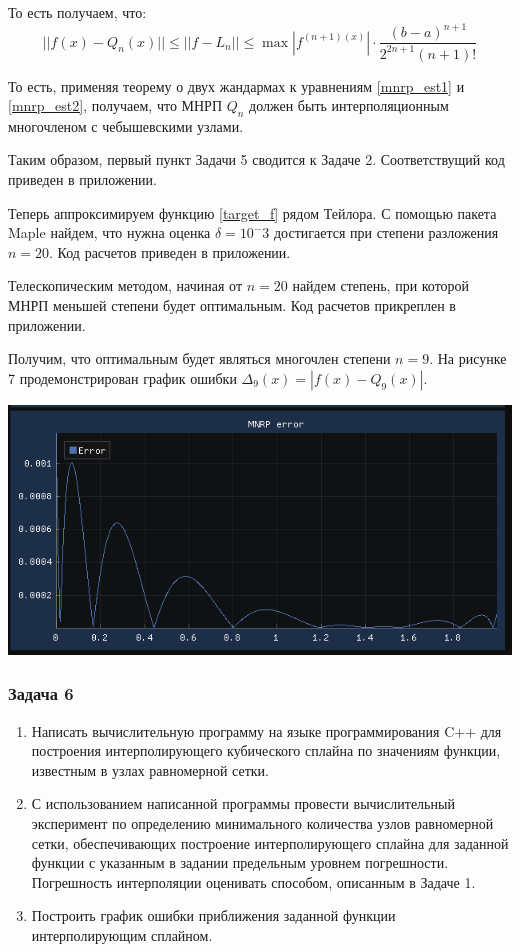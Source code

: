 \documentclass[a4paper, fontsize=14pt]{article}
\begin{document}
    То есть получаем, что:
    \begin{equation}
        \label{mnrp_est2}
        || f(x) - Q_n(x) || \leq || f - L_n || \leq \operatorname{max} |f^{(n+1)(x)}| \cdot \frac{(b-a)^{n+1}}{2^{2n+1} (n+1)!}
    \end{equation}

    То есть, применяя теорему о двух жандармах к уравнениям \eqref{mnrp_est1} и \eqref{mnrp_est2}, получаем, что МНРП $Q_n$ должен быть интерполяционным многочленом с чебышевскими узлами.

    Таким образом, первый пункт Задачи 5 сводится к Задаче 2. Соответствущий код приведен в приложении.

    Теперь аппроксимируем функцию \eqref{target_f} рядом Тейлора. С помощью пакета Maple найдем, что нужна оценка $\delta = 10^-3$ достигается при степени разложения $n=20$. Код расчетов приведен в приложении. 

    Телескопическим методом, начиная от $n=20$ найдем степень, при которой МНРП меньшей степени будет оптимальным. Код расчетов прикреплен в приложении. 
    
    Получим, что оптимальным будет являться многочлен степени $n=9$.
    На рисунке 7 продемонстрирован график ошибки $\Delta_9(x) = | f(x) - Q_9(x) |$.
    \begin{center}
        \includegraphics[]{src/mnrp_error.png}
    \end{center}
    \subsubsection*{Задача 6}
    \begin{enumerate}
        \item Написать вычислительную программу на языке программирования C++ для построения интерполирующего кубического сплайна по значениям функции, известным в узлах равномерной сетки. 
        \item С использованием написанной программы провести вычислительный эксперимент по определению минимального количества узлов равномерной сетки, обеспечивающих построение интерполирующего сплайна для заданной функции с указанным в задании предельным уровнем погрешности. Погрешность интерполяции оценивать способом, описанным в Задаче 1.
        \item Построить график ошибки приближения заданной функции интерполирующим сплайном.
    \end{enumerate}
    
\end{document}
